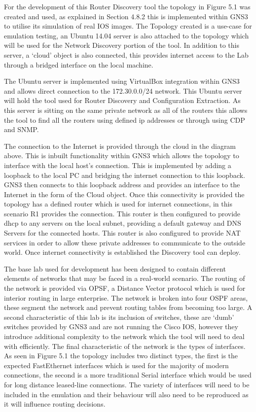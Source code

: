 \documentclass[11pt]{report}
\begin{document}
For the development of this Router Discovery tool the topology in Figure 5.1 was created and used, as explained in Section 4.8.2 this is implemented within GNS3 to utilise its simulation of real IOS images. The Topology created is a use-case for emulation testing, an Ubuntu 14.04 server is also attached to the topology which will be used for the Network Discovery portion of the tool. In addition to this server, a `cloud' object is also connected, this provides internet access to the Lab through a bridged interface on the local machine.

The Ubuntu server is implemented using VirtualBox integration within GNS3 and allows direct connection to the 172.30.0.0/24 network. This Ubuntu server will hold the tool used for Router Discovery and Configuration Extraction. As this server is sitting on the same private network as all of the routers this allows the tool to find all the routers using defined ip addresses or through using CDP and SNMP.

The connection to the Internet is provided through the cloud in the diagram above. This is inbuilt functionality within GNS3 which allows the topology to interface with the local host’s connection. This is implemented by adding a loopback to the local PC and bridging the internet connection to this loopback. GNS3 then connects to this loopback address and provides an interface to the Internet in the form of the Cloud object. Once this connectivity is provided the topology has a defined router which is used for internet connections, in this scenario R1 provides the connection. This router is then configured to provide dhcp to any servers on the local subnet, providing a default gateway and DNS Servers for the connected hosts. This router is also configured to provide NAT services in order to allow these private addresses to communicate to the outside world. Once internet connectivity is established the Discovery tool can deploy.

The base lab used for development has been designed to contain different elements of networks that may be faced in a real-world scenario. The routing of the network is provided via OPSF, a Distance Vector protocol which is used for interior routing in large enterprise. The network is broken into four OSPF areas, these segment the network and prevent routing tables from becoming too large. A second characteristic of this lab is its inclusion of switches, these are `dumb' switches provided by GNS3 and are not running the Cisco IOS, however they introduce additional complexity to the network which the tool will need to deal with efficiently. The final characteristic of the network is the types of interfaces. As seen in Figure 5.1 the topology includes two distinct types, the first is the expected FastEthernet interfaces which is used for the majority of modern connections, the second is a more traditional Serial interface which would be used for long distance leased-line connections. The variety of interfaces will need to be included in the emulation and their behaviour will also need to be reproduced as it will influence routing decisions.
\end{document}
